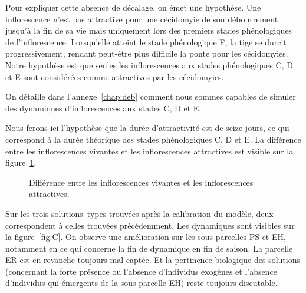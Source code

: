 Pour expliquer cette absence de décalage, on émet une hypothèse.
Une inflorescence n'est pas attractive pour une cécidomyie de son débourrement jusqu'à la fin de sa vie mais uniquement lors des premiers stades phénologiques de l'inflorescence.
Lorsqu'elle atteint le stade phénologique F, la tige se durcit progressivement, rendant peut-être plus difficile la ponte pour les cécidomyies.
Notre hypothèse est que seules les inflorescences aux stades phénologiques C, D et E sont considérées comme attractives par les cécidomyies.

On détaille dans l'annexe~\ref{chap:deb} comment nous sommes capables de simuler des dynamiques d'inflorescences aux stades C, D et E.

Nous ferons ici l'hypothèse que la durée d'attractivité est de seize jours, ce qui correspond à la durée théorique des stades phénologiques C, D et E.
La différence entre les inflorescences vivantes et les inflorescences attractives est visible sur la figure~\ref{fig:CDE}.

\begin{figure}[ht]
 \centering
 \caption{Différence entre les inflorescences vivantes et les inflorescences attractives.}
 \label{fig:CDE}
\end{figure}


Sur les trois solutions--types trouvées après la calibration du modèle, deux correspondent à celles trouvées précédemment.
Les dynamiques sont visibles sur la figure~\ref{fig:C}.
On observe une amélioration sur les sous-parcelles PS et EH, notamment en ce qui concerne la fin de dynamique en fin de saison.
La parcelle ER est en revanche toujours mal captée.
Et la pertinence biologique des solutions (concernant la forte présence ou l'absence d'individus exogènes et l'absence d'individus qui émergents de la sous-parcelle EH) reste toujours discutable.

